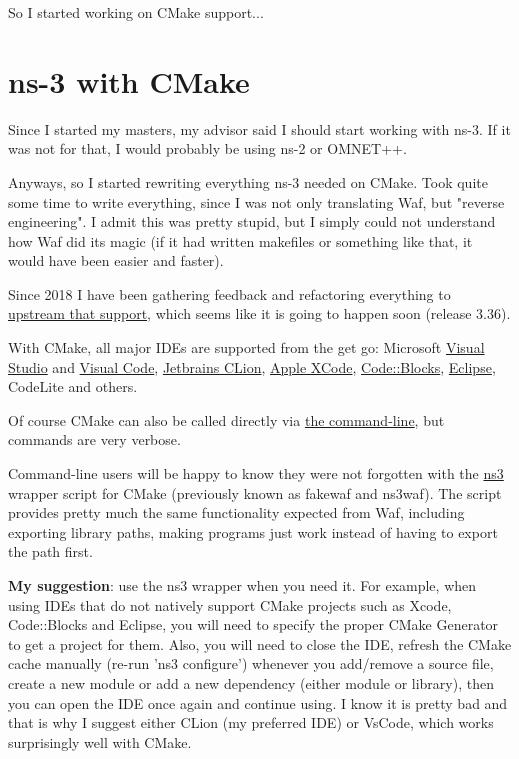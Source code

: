 \documentclass{article}
\begin{document}
    So I started working on CMake support...

\section*{ns-3 with CMake}
    Since I started my masters, my advisor said I should start working with ns-3. If it was not for that, I would
    probably be using ns-2 or OMNET++.

    Anyways, so I started rewriting everything ns-3 needed on CMake. Took quite some time to write everything, since
    I was not only translating Waf, but "reverse engineering". I admit this was pretty stupid, but I simply could not
    understand how Waf did its magic (if it had written makefiles or something like that, it would have been easier
    and faster).

    Since 2018 I have been gathering feedback and refactoring everything to
    \href{https://gitlab.com/nsnam/ns-3-dev/-/merge_requests/460}{upstream that support}, which seems like
    it is going to happen soon (release 3.36).

    With CMake, all major IDEs are supported from the get go: Microsoft
    \href{https://gabrielcarvfer.github.io/NS3/installation/visualstudio}{Visual Studio} and
    \href{https://gabrielcarvfer.github.io/NS3/installation/visualcode}{Visual Code},
    \href{https://gabrielcarvfer.github.io/NS3/installation/clion}{Jetbrains CLion},
    \href{https://gabrielcarvfer.github.io/NS3/installation/xcode}{Apple XCode},
    \href{https://gabrielcarvfer.github.io/NS3/installation/codeblocks}{Code::Blocks},
    \href{https://gabrielcarvfer.github.io/NS3/installation/eclipse}{Eclipse},
    CodeLite and others.

    Of course CMake can also be called directly via
    \href{https://gabrielcarvfer.github.io/NS3/installation/terminal}{the command-line}, but commands are very verbose.

    Command-line users will be happy to know they were not forgotten with the
    \href{https://gabrielcarvfer.github.io/NS3/installation/ns3waf}{ns3} wrapper script for CMake
    (previously known as fakewaf and ns3waf).
    The script provides pretty much the same functionality expected from Waf, including exporting library paths, making
    programs just work instead of having to export the path first.

    \textbf{My suggestion}: use the ns3 wrapper when you need it. For example, when using IDEs that do not natively
    support CMake projects such as Xcode, Code::Blocks and Eclipse, you will need to specify the proper CMake
    Generator to get a project for them. Also, you will need to close the IDE, refresh the CMake cache manually
    (re-run 'ns3 configure') whenever you add/remove a source file, create a new module or add a new dependency
    (either module or library), then you can open the IDE once again and continue using. I know it is pretty bad and
    that is why I suggest either CLion (my preferred IDE) or VsCode, which works surprisingly well with CMake.
\end{document}
